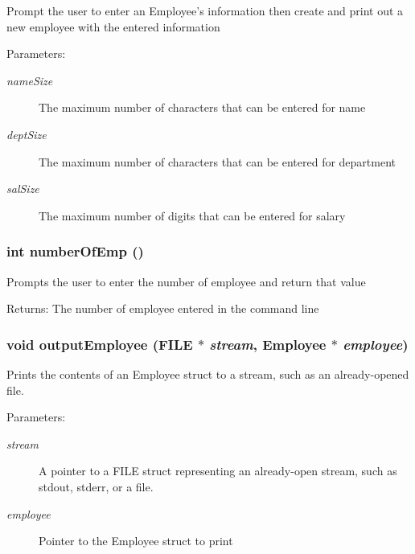 Prompt the user to enter an Employee's information then create and print out a new employee with the entered information \begin{Desc}
\item[Parameters:]
\begin{description}
\item[{\em name\-Size}]The maximum number of characters that can be entered for name \item[{\em dept\-Size}]The maximum number of characters that can be entered for department \item[{\em sal\-Size}]The maximum number of digits that can be entered for salary \end{description}
\end{Desc}
\subsubsection{\setlength{\rightskip}{0pt plus 5cm}int number\-Of\-Emp ()}\label{struct_8c_d780e2a0cc7c9df2861e5f5fd1742fa9}


Prompts the user to enter the number of employee and return that value \begin{Desc}
\item[Returns:]The number of employee entered in the command line \end{Desc}
\subsubsection{\setlength{\rightskip}{0pt plus 5cm}void output\-Employee (FILE $\ast$ {\em stream}, \bf{Employee} $\ast$ {\em employee})}\label{struct_8c_106ec703689a1f0249d6f598df15fd93}


Prints the contents of an Employee struct to a stream, such as an already-opened file. \begin{Desc}
\item[Parameters:]
\begin{description}
\item[{\em stream}]A pointer to a FILE struct representing an already-open stream, such as stdout, stderr, or a file. \item[{\em employee}]Pointer to the Employee struct to print \end{description}
\end{Desc}
